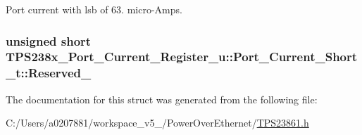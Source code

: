 Port current with lsb of 63. micro-\/\-Amps. 

\hypertarget{struct_t_p_s238x___port___current___register__u_1_1_port___current___short__t_a8b74c71335121601d3fc283721bbecc2}{
\subsubsection[{Reserved\-\_\-14}]{\setlength{\rightskip}{0pt plus 5cm}unsigned short T\-P\-S238x\-\_\-\-Port\-\_\-\-Current\-\_\-\-Register\-\_\-u\-::\-Port\-\_\-\-Current\-\_\-\-Short\-\_\-t\-::\-Reserved\-\_}}\label{struct_t_p_s238x___port___current___register__u_1_1_port___current___short__t_a8b74c71335121601d3fc283721bbecc2}


The documentation for this struct was generated from the following file\-:\begin{DoxyCompactItemize}
\item 
C\-:/\-Users/a0207881/workspace\-\_\-v5\-\_/\-Power\-Over\-Ethernet/\hyperlink{_t_p_s23861_8h}{T\-P\-S23861.\-h}\end{DoxyCompactItemize}
